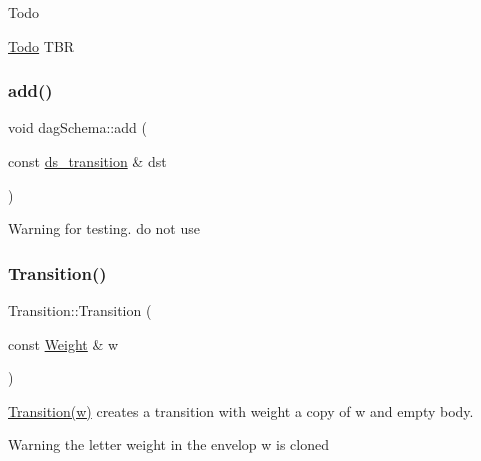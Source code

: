 \begin{DoxyRefDesc}{Todo}
\item[\mbox{\hyperlink{todo__todo000016}{Todo}}]T\+BR \end{DoxyRefDesc}
\mbox{\label{group__schemata_ga0dc3e9cf7edbc289976639574ca23d20}} 
\subsubsection{\texorpdfstring{add()}{add()}\hspace{0.1cm}{\footnotesize\ttfamily [1/3]}}
{\footnotesize\ttfamily void dag\+Schema\+::add (\begin{DoxyParamCaption}\item[{const \mbox{\hyperlink{structds__transition}{ds\+\_\+transition}} \&}]{dst }\end{DoxyParamCaption})}

\begin{DoxyWarning}{Warning}
for testing. do not use 
\end{DoxyWarning}
\mbox{\label{group__schemata_ga6e08e637325ab62ee6bfbdb99c8f8a71}} 
\subsubsection{\texorpdfstring{Transition()}{Transition()}\hspace{0.1cm}{\footnotesize\ttfamily [1/3]}}
{\footnotesize\ttfamily Transition\+::\+Transition (\begin{DoxyParamCaption}\item[{const \mbox{\hyperlink{classWeight}{Weight}} \&}]{w }\end{DoxyParamCaption})}



\mbox{\hyperlink{classTransition}{Transition(w)}} creates a transition with weight a copy of w and empty body. 

\begin{DoxyWarning}{Warning}
the letter weight in the envelop w is cloned 
\end{DoxyWarning}
\mbox{\label{group__schemata_gad126f7c68acac0315b1782decaf54d3b}} 
